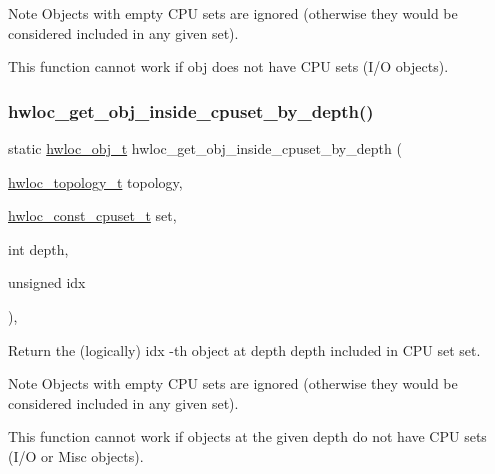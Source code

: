 \begin{DoxyNote}{Note}
Objects with empty C\+PU sets are ignored (otherwise they would be considered included in any given set).

This function cannot work if obj does not have C\+PU sets (I/O objects). 
\end{DoxyNote}
\mbox{\label{a00195_gaec86f1f88832836e3f9338e246ea5862}} 
\subsubsection{\texorpdfstring{hwloc\+\_\+get\+\_\+obj\+\_\+inside\+\_\+cpuset\+\_\+by\+\_\+depth()}{hwloc\_get\_obj\_inside\_cpuset\_by\_depth()}}
{\footnotesize\ttfamily static \hyperlink{a00185_ga79b8ab56877ef99ac59b833203391c7d}{hwloc\+\_\+obj\+\_\+t} hwloc\+\_\+get\+\_\+obj\+\_\+inside\+\_\+cpuset\+\_\+by\+\_\+depth (\begin{DoxyParamCaption}\item[{\hyperlink{a00186_ga9d1e76ee15a7dee158b786c30b6a6e38}{hwloc\+\_\+topology\+\_\+t}}]{topology,  }\item[{\hyperlink{a00183_ga1f784433e9b606261f62d1134f6a3b25}{hwloc\+\_\+const\+\_\+cpuset\+\_\+t}}]{set,  }\item[{int}]{depth,  }\item[{unsigned}]{idx }\end{DoxyParamCaption})\hspace{0.3cm}{\ttfamily [inline]}, {\ttfamily [static]}}



Return the (logically) {\ttfamily idx} -\/th object at depth {\ttfamily depth} included in C\+PU set {\ttfamily set}. 

\begin{DoxyNote}{Note}
Objects with empty C\+PU sets are ignored (otherwise they would be considered included in any given set).

This function cannot work if objects at the given depth do not have C\+PU sets (I/O or Misc objects). 
\end{DoxyNote}
\mbox{\label{a00195_ga2edf924e5a0cca9cb22f65cc77c6ddb5}} 

